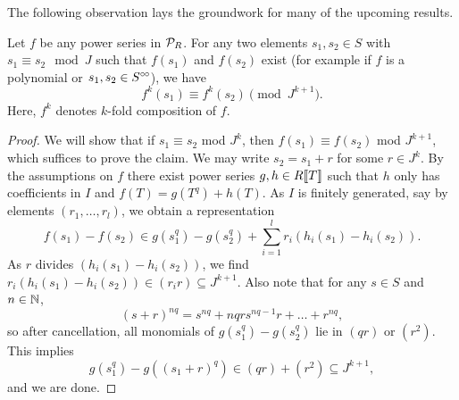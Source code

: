 \documentclass[../main.tex]{subfiles}
\begin{document}
The following observation lays the groundwork for many of the upcoming results.
\begin{lem}\label{lem:cryscalc}
  Let $f$ be any power series in $\mathcal{P}_R$. For any two elements $s_1,s_2 \in S$ 
  with $s_1 \equiv s_2 \mod J$ such that $f(s_1)$ and $f(s_2)$ exist (for
  example if $f$ is a polynomial or $s_1, s_2 \in S^{\circ \hspace{-0.5pt} \circ}$), we have 
  \begin{equation*}
    f^k(s_1) \equiv f^k(s_2) \pmod {J^{k+1}}.
  \end{equation*}
  Here, $f^k$ denotes $k$-fold composition of $f$.
\begin{proof}
  We will show that if $s_1 \equiv s_2$ mod $J^k$, then $f(s_1) \equiv f(s_2)$ mod 
  $J^{k+1}$, which suffices to prove the claim. 
  We may write $s_2 = s_1 + r$ for some $r\in J^k$. By the assumptions on $f$
  there exist power series 
  $g,h \in R\llbracket T \rrbracket$ such that $h$ only
  has coefficients in $I$ and $f(T) = g(T^q) + h(T)$. As $I$ is finitely generated,
  say by elements $(r_1, \dots, r_l)$, we obtain a representation 
  \begin{equation*}
    f(s_1) - f(s_2) \in g(s_1^{q})-g(s_2^{q}) + \sum_{i=1}^l r_i \left(h_i(s_1) -
    h_i(s_2)\right).
  \end{equation*}
  As $r$ divides $\left(h_i(s_1) - h_i(s_2)\right)$, we find
  $r_i(h_i(s_1) - h_i(s_2)) \in (r_i r) \subseteq J^{k+1}$. Also note that 
  for any $s\in S$ and $n \in \mathbb{N}$, 
  $$(s+r)^{nq} = s^{nq} + nqrs^{nq-1}r + \dots + r^{nq},$$
  so after cancellation, all monomials of $g(s_1^q) - g(s_2^q)$ lie in
  $(qr)$ or $(r^2)$. This implies
  \begin{equation*}
    g(s_1^q) - g\left((s_1+r)^q\right) \in (qr) + (r^2) \subseteq J^{k+1},
  \end{equation*}
  and we are done.
\end{proof}
\end{lem}
\end{document}
